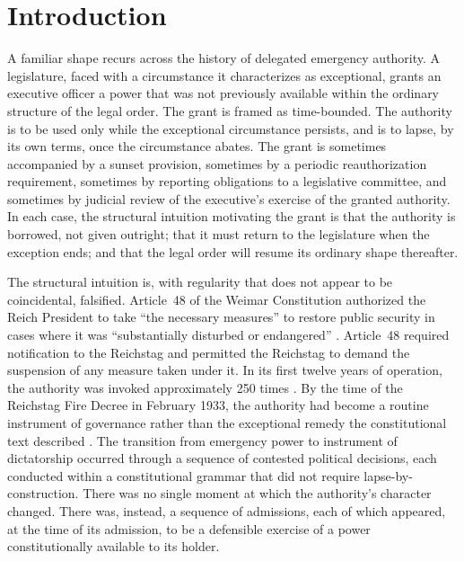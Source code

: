 \section{Introduction}
\label{sec:intro}

A familiar shape recurs across the history of delegated emergency authority.
A legislature, faced with a circumstance it characterizes as exceptional,
grants an executive officer a power that was not previously available within the ordinary structure of the legal order.
The grant is framed as time-bounded.
The authority is to be used only while the exceptional circumstance persists,
and is to lapse, by its own terms, once the circumstance abates.
The grant is sometimes accompanied by a sunset provision,
sometimes by a periodic reauthorization requirement,
sometimes by reporting obligations to a legislative committee,
and sometimes by judicial review of the executive's exercise of the granted authority.
In each case, the structural intuition motivating the grant is that the authority is borrowed,
not given outright;
that it must return to the legislature when the exception ends;
and that the legal order will resume its ordinary shape thereafter.

The structural intuition is, with regularity that does not appear to be coincidental, falsified.
Article~48 of the Weimar Constitution authorized the Reich President to take ``the necessary measures''
to restore public security in cases where it was ``substantially disturbed or endangered''
\cite{ref_weimar_const_art48}.
Article~48 required notification to the Reichstag and permitted the Reichstag to demand the suspension of any measure taken under it.
In its first twelve years of operation, the authority was invoked approximately 250 times \cite{ref_kershaw_hitler}.
By the time of the Reichstag Fire Decree in February 1933, the authority had become a routine instrument of governance
rather than the exceptional remedy the constitutional text described \cite{ref_caldwell_popular_sovereignty}.
The transition from emergency power to instrument of dictatorship occurred through a sequence of contested political decisions,
each conducted within a constitutional grammar that did not require lapse-by-construction.
There was no single moment at which the authority's character changed.
There was, instead, a sequence of admissions, each of which appeared, at the time of its admission,
to be a defensible exercise of a power constitutionally available to its holder.

